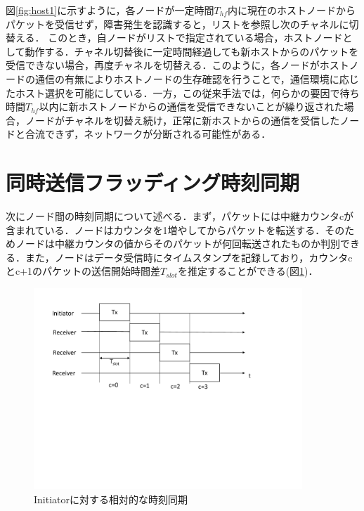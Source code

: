 図\ref{fig:host1}に示すように，各ノードが一定時間$T_{hf}$内に現在のホストノードからパケットを受信せず，障害発生を認識すると，リストを参照し次のチャネルに切替える．
このとき，自ノードがリストで指定されている場合，ホストノードとして動作する．チャネル切替後に一定時間経過しても新ホストからのパケットを受信できない場合，再度チャネルを切替える．このように，各ノードがホストノードの通信の有無によりホストノードの生存確認を行うことで，通信環境に応じたホスト選択を可能にしている．一方，この従来手法では，何らかの要因で待ち時間$T_{hf}$以内に新ホストノードからの通信を受信できないことが繰り返された場合，ノードがチャネルを切替え続け，正常に新ホストからの通信を受信したノードと合流できず，ネットワークが分断される可能性がある．



 \section{同時送信フラッディング時刻同期}
 \label{sec:time}
次にノード間の時刻同期について述べる．まず，パケットには中継カウンタcが含まれている．ノードはカウンタを1増やしてからパケットを転送する．そのためノードは中継カウンタの値からそのパケットが何回転送されたものか判別できる．また，ノードはデータ受信時にタイムスタンプを記録しており，カウンタcとc+1のパケットの送信開始時間差$T_{slot}$を推定することができる(図\ref{fig:time})．

\begin{figure}[H]
\centering
\includegraphics[width=0.9\textwidth]{figures/ts.pdf}
 \vspace{-40mm}
 \caption{Initiatorに対する相対的な時刻同期}
 \label{fig:time}
\end{figure}

